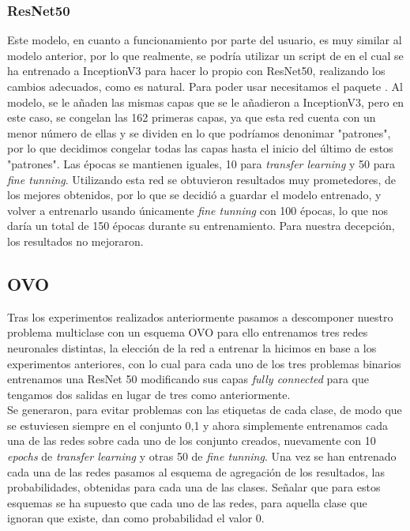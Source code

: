 \subsubsection{ResNet50}

Este modelo, en cuanto a funcionamiento por parte del usuario, es muy similar al modelo anterior, por lo que realmente, se podría utilizar un script de en el cual se ha entrenado a InceptionV3 para hacer lo propio con ResNet50, realizando los cambios adecuados, como es natural. Para poder usar  necesitamos el paquete . Al modelo, se le añaden las mismas capas que se le añadieron a InceptionV3, pero en este caso, se congelan las 162 primeras capas, ya que esta red cuenta con un menor número de ellas y se dividen en lo que podríamos denonimar "patrones", por lo que decidimos congelar todas las capas hasta el inicio del último de estos "patrones". Las épocas se mantienen iguales, 10 para \textit{transfer learning} y 50 para \textit{fine tunning}. Utilizando esta red se obtuvieron resultados muy prometedores, de los mejores obtenidos, por lo que se decidió a guardar el modelo entrenado, y volver a entrenarlo usando únicamente \textit{fine tunning} con 100 épocas, lo que nos daría un total de 150 épocas durante su entrenamiento. Para nuestra decepción, los resultados no mejoraron.


\subsection{OVO}

Tras los experimentos realizados anteriormente pasamos a descomponer nuestro problema multiclase con un esquema OVO para ello entrenamos tres redes neuronales distintas, la elección de la red a entrenar la hicimos en base a los experimentos anteriores, con lo cual para cada uno de los tres problemas binarios entrenamos una ResNet 50 modificando sus capas \textit{fully connected} para que tengamos dos salidas en lugar de tres como anteriormente.\\

Se generaron, para evitar problemas con las etiquetas de cada clase, de modo que se estuviesen siempre en el conjunto {0,1} y ahora simplemente entrenamos cada una de las redes sobre cada uno de los conjunto creados, nuevamente con 10 \textit{epochs} de \textit{transfer learning} y otras 50 de \textit{fine tunning}. Una vez se han entrenado cada una de las redes pasamos al esquema de agregación de los resultados, las probabilidades, obtenidas para cada una de las clases. Señalar que para estos esquemas se ha supuesto que cada uno de las redes, para aquella clase que ignoran que existe, dan como probabilidad el valor 0.\\

